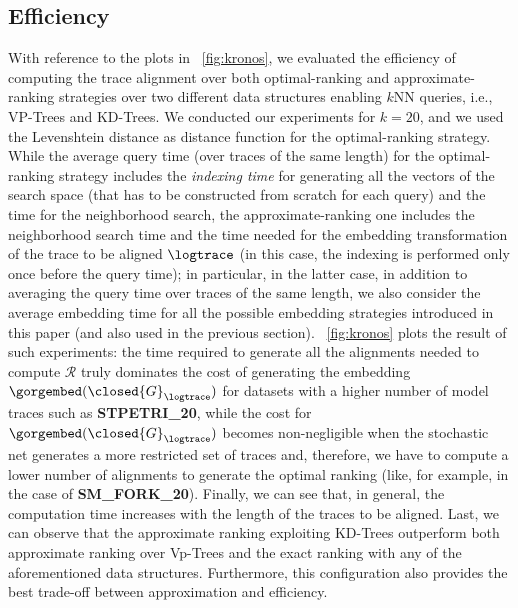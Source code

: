 \subsection{Efficiency}\label{subsec:efficio}
With reference to the plots in \figurename~\ref{fig:kronos}, we evaluated the efficiency of computing the trace alignment over both optimal-ranking   and approximate-ranking   strategies over two different data structures enabling $k$NN queries, i.e., VP-Trees and KD-Trees. We conducted our experiments for $k=20$, and we used the Levenshtein distance as distance function for the optimal-ranking strategy. While the average query time (over traces of the same length) for the optimal-ranking strategy includes the \textit{indexing time} for generating all the vectors of the search space (that has to be constructed from scratch for each query) and the time for the neighborhood search, the approximate-ranking one includes the neighborhood search time and the time needed for the embedding transformation of the trace to be aligned $\logtrace$ (in this case, the indexing is performed only once before the query time); in particular, in the latter case, in addition to averaging the query time over traces of the same length, we also consider the average embedding time for all the possible embedding strategies introduced in this paper (and also used in the previous section). \figurename~\ref{fig:kronos} plots the result of such experiments: the time required to generate all the alignments needed to compute $\mathcal{R}$ truly dominates the cost of generating the embedding $\gorgembed(\closed{G}_\logtrace)$ for datasets with a higher number of model traces such as \textbf{STPETRI\_20}, while the cost for $\gorgembed(\closed{G}_\logtrace)$ becomes non-negligible when the stochastic net generates a more restricted set of traces and, therefore, we have to compute a lower number of alignments to generate the optimal ranking (like, for example, in the case of \textbf{SM\_FORK\_20}). Finally, we can see that, in general, the computation time increases with the length of the traces to be aligned. Last, we can observe that the approximate ranking exploiting KD-Trees outperform both approximate ranking over Vp-Trees and the exact ranking with any of the aforementioned data structures. Furthermore, this configuration also provides the best trade-off between approximation and efficiency. 